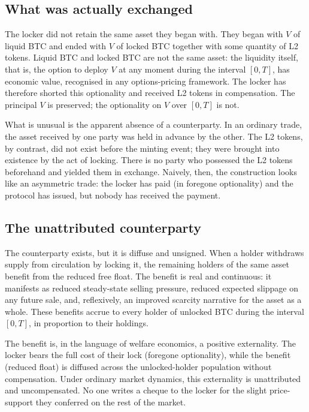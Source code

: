 \documentclass[11pt,a4paper]{article}
\begin{document}
\subsection{What was actually exchanged}

The locker did not retain the same asset they began with. They began with $V$ of liquid BTC and ended with $V$ of locked BTC together with some quantity of L2 tokens. Liquid BTC and locked BTC are not the same asset: the liquidity itself, that is, the option to deploy $V$ at any moment during the interval $[0, T]$, has economic value, recognised in any options-pricing framework. The locker has therefore shorted this optionality and received L2 tokens in compensation. The principal $V$ is preserved; the optionality on $V$ over $[0, T]$ is not.

What is unusual is the apparent absence of a counterparty. In an ordinary trade, the asset received by one party was held in advance by the other. The L2 tokens, by contrast, did not exist before the minting event; they were brought into existence by the act of locking. There is no party who possessed the L2 tokens beforehand and yielded them in exchange. Naively, then, the construction looks like an asymmetric trade: the locker has paid (in foregone optionality) and the protocol has issued, but nobody has received the payment.

\subsection{The unattributed counterparty}

The counterparty exists, but it is diffuse and unsigned. When a holder withdraws supply from circulation by locking it, the remaining holders of the same asset benefit from the reduced free float. The benefit is real and continuous: it manifests as reduced steady-state selling pressure, reduced expected slippage on any future sale, and, reflexively, an improved scarcity narrative for the asset as a whole. These benefits accrue to every holder of unlocked BTC during the interval $[0, T]$, in proportion to their holdings.

The benefit is, in the language of welfare economics, a positive externality. The locker bears the full cost of their lock (foregone optionality), while the benefit (reduced float) is diffused across the unlocked-holder population without compensation. Under ordinary market dynamics, this externality is unattributed and uncompensated. No one writes a cheque to the locker for the slight price-support they conferred on the rest of the market.
\end{document}
